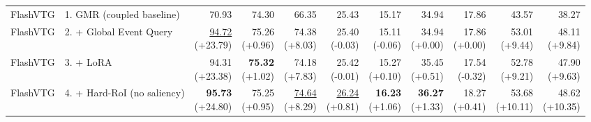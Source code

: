 \documentclass{article}
\begin{document}
{\begin{tabular}{llrrrrrrrrr}
\midrule
FlashVTG & 1. GMR (coupled baseline) & 70.93 & 74.30 & 66.35 & 25.43 & 15.17 & 34.94 & 17.86 & 43.57 & 38.27 \\
FlashVTG & 2. + Global Event Query & \shortstack{\underline{94.72} \\ {\scriptsize (+23.79)}} & \shortstack{75.26 \\ {\scriptsize (+0.96)}} & \shortstack{74.38 \\ {\scriptsize (+8.03)}} & \shortstack{25.40 \\ {\scriptsize (-0.03)}} & \shortstack{15.11 \\ {\scriptsize (-0.06)}} & \shortstack{34.94 \\ {\scriptsize (+0.00)}} & \shortstack{17.86 \\ {\scriptsize (+0.00)}} & \shortstack{53.01 \\ {\scriptsize (+9.44)}} & \shortstack{48.11 \\ {\scriptsize (+9.84)}} \\
FlashVTG & 3. + LoRA & \shortstack{94.31 \\ {\scriptsize (+23.38)}} & \shortstack{\textbf{75.32} \\ {\scriptsize (+1.02)}} & \shortstack{74.18 \\ {\scriptsize (+7.83)}} & \shortstack{25.42 \\ {\scriptsize (-0.01)}} & \shortstack{15.27 \\ {\scriptsize (+0.10)}} & \shortstack{35.45 \\ {\scriptsize (+0.51)}} & \shortstack{17.54 \\ {\scriptsize (-0.32)}} & \shortstack{52.78 \\ {\scriptsize (+9.21)}} & \shortstack{47.90 \\ {\scriptsize (+9.63)}} \\
FlashVTG & 4. + Hard-RoI (no saliency) & \shortstack{\textbf{95.73} \\ {\scriptsize (+24.80)}} & \shortstack{75.25 \\ {\scriptsize (+0.95)}} & \shortstack{\underline{74.64} \\ {\scriptsize (+8.29)}} & \shortstack{\underline{26.24} \\ {\scriptsize (+0.81)}} & \shortstack{\textbf{16.23} \\ {\scriptsize (+1.06)}} & \shortstack{\textbf{36.27} \\ {\scriptsize (+1.33)}} & \shortstack{18.27 \\ {\scriptsize (+0.41)}} & \shortstack{53.68 \\ {\scriptsize (+10.11)}} & \shortstack{48.62 \\ {\scriptsize (+10.35)}} \\

\end{tabular}}
\end{document}
